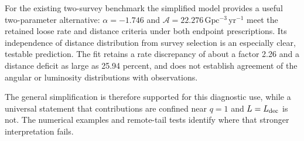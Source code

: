 
For the existing two-survey benchmark the simplified model provides a useful
two-parameter alternative: $\alpha=-1.746$ and
$\mathcal A=22.276\,\mathrm{Gpc^{-3}\,yr^{-1}}$ meet the
retained loose rate and distance criteria under both endpoint prescriptions.
Its independence of distance distribution from survey selection is an especially
clear, testable prediction. The fit retains a rate discrepancy of about a factor
2.26 and a distance deficit as large as 25.94 percent, and does not establish
agreement of the angular or luminosity distributions with observations.

The general simplification is therefore supported for this diagnostic use,
while a universal statement that contributions are confined near $q=1$ and
$L=L_{\rm dec}$ is not. The numerical examples and remote-tail tests identify
where that stronger interpretation fails.


